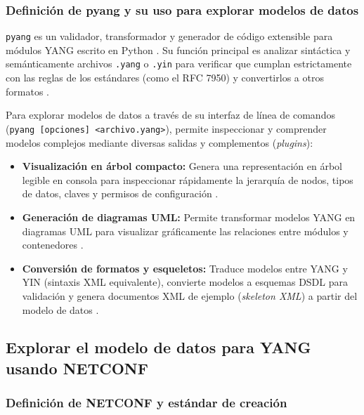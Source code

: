 \documentclass[12pt,a4paper]{article}
\begin{document}
\subsubsection{Definición de pyang y su uso para explorar modelos de datos}

\texttt{pyang} es un validador, transformador y generador de código extensible para módulos YANG escrito en Python \parencite{pyang_github}. Su función principal es analizar sintáctica y semánticamente archivos \texttt{.yang} o \texttt{.yin} para verificar que cumplan estrictamente con las reglas de los estándares (como el RFC 7950) y convertirlos a otros formatos \parencite{pyang_github}.

Para explorar modelos de datos a través de su interfaz de línea de comandos (\texttt{pyang [opciones] <archivo.yang>}), permite inspeccionar y comprender modelos complejos mediante diversas salidas y complementos (\textit{plugins}):

\begin{itemize}
    \item \textbf{Visualización en árbol compacto:} Genera una representación en árbol legible en consola para inspeccionar rápidamente la jerarquía de nodos, tipos de datos, claves y permisos de configuración \parencite{pyang_github}.
    \item \textbf{Generación de diagramas UML:} Permite transformar modelos YANG en diagramas UML para visualizar gráficamente las relaciones entre módulos y contenedores \parencite{pyang_github}.
    \item \textbf{Conversión de formatos y esqueletos:} Traduce modelos entre YANG y YIN (sintaxis XML equivalente), convierte modelos a esquemas DSDL para validación y genera documentos XML de ejemplo (\textit{skeleton XML}) a partir del modelo de datos \parencite{pyang_github}.
\end{itemize}


\subsection{Explorar el modelo de datos para YANG usando NETCONF}

\subsubsection{Definición de NETCONF y estándar de creación}
\end{document}
